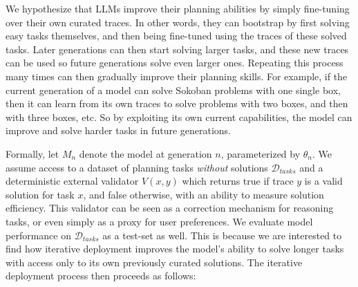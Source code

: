 \documentclass{article}
\begin{document}
We hypothesize that LLMs improve their planning abilities by simply fine-tuning
over their own curated traces. In other words, they can bootstrap by first
solving easy tasks themselves, and then being fine-tuned using the traces of
these solved tasks. Later generations can then start solving larger tasks, and
these new traces can be used so future generations solve even larger
ones. Repeating this process many times can then gradually improve their planning skills. For
example, if the current generation of a model can solve Sokoban problems with
one single box, then it can learn from its own traces to solve problems with two
boxes, and then with three boxes, etc. So by exploiting its own current
capabilities, the model can improve and solve harder tasks in future
generations.

Formally, let $M_n$ denote the model at generation $n$, parameterized by $\theta_n$. We assume access to a dataset of planning tasks \emph{without} solutions $\mathcal{D}_{tasks}$ and a deterministic external validator $V(x, y)$ which returns true if trace $y$ is a valid solution for task $x$, and false otherwise, with an ability to measure solution efficiency. This validator can be seen as a correction mechanism for reasoning tasks, or even simply as a proxy for user preferences. We evaluate model performance on  $\mathcal{D}_{tasks}$ as a test-set as well. This is because we are interested to find how iterative deployment improves the model's ability to solve longer tasks with access only to its own previously curated solutions. The iterative deployment process then proceeds as follows:
\end{document}
